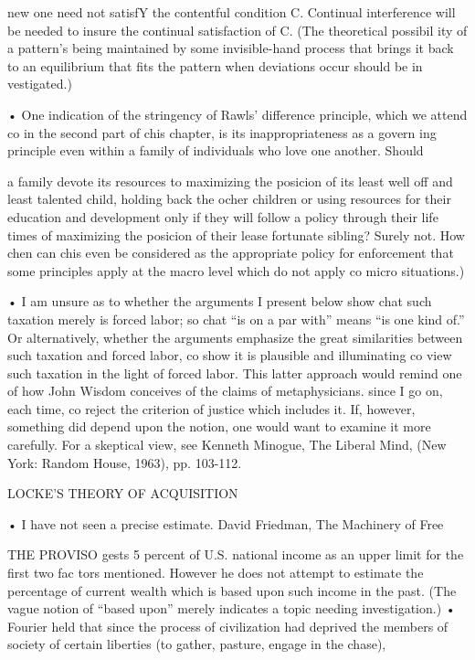 \documentclass[11pt,openany]{book}
\begin{document}
{new one need not satisfY the contentful condition C. Continual interference will be needed to insure the continual satisfaction of C. (The theoretical possibil ity of a pattern's being maintained by some invisible-hand process that brings it back to an equilibrium that fits the pattern when deviations occur should be in vestigated.)\par

• One indication of the stringency of Rawls' difference principle, which we attend co in the second part of chis chapter, is its inappropriateness as a govern ing principle even within a family of individuals who love one another. Should\par

a family devote its resources to maximizing the posicion of its least well off and least talented child, holding back the ocher children or using resources for their education and development only if they will follow a policy through their life times of maximizing the posicion of their lease fortunate sibling? Surely not. How chen can chis even be considered as the appropriate policy for enforcement that some principles apply at the macro level which do not apply co micro situations.)\par

• I am unsure as to whether the arguments I present below show chat such taxation merely is forced labor; so chat ``is on a par with'' means ``is one kind of.'' Or alternatively, whether the arguments emphasize the great similarities between such taxation and forced labor, co show it is plausible and illuminating co view such taxation in the light of forced labor. This latter approach would remind one of how John Wisdom conceives of the claims of metaphysicians. since I go on, each time, co reject the criterion of justice which includes it. If, however, something did depend upon the notion, one would want to examine it more carefully. For a skeptical view, see Kenneth Minogue, The Liberal Mind, (New York: Random House, 1963), pp. 103-112.\par

LOCKE'S THEORY OF ACQUISITION\par

• I have not seen a precise estimate. David Friedman, The Machinery of Free\par

THE PROVISO gests 5 percent of U.S. national income as an upper limit for the first two fac tors mentioned. However he does not attempt to estimate the percentage of current wealth which is based upon such income in the past. (The vague notion of ``based upon'' merely indicates a topic needing investigation.) • Fourier held that since the process of civilization had deprived the members of society of certain liberties (to gather, pasture, engage in the chase),\par

}
\end{document}
